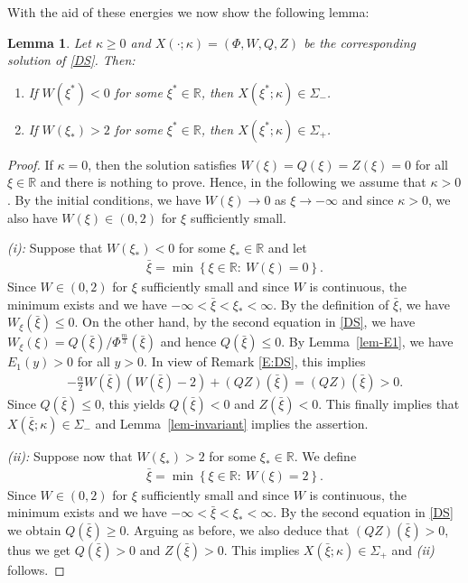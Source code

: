 \documentclass{article}%
\newtheorem{lemma}[theorem]{Lemma}
\newcommand{\alp}{\alpha}
\newcommand{\kap}{\kappa}
\newcommand{\R}{\mathbb{R}}
\begin{document}
With the aid of these energies we now show the following lemma:
\begin{lemma} \label{lem-bounds} %
  Let $\kap \geq 0$ and
  $X(\cdot;\kap)=(\Phi,W,Q,Z)$ be the corresponding solution of \eqref{DS}.
  Then:
  \begin{enumerate}
  \item If $W(\xi^{*}) <0$ for some $\xi^{*} \in \R$, then $X(\xi^{*};\kap)\in\Sigma_{-}$.
  \item If $W(\xi_{\ast})>2$ for some $\xi^{*} \in \R$, then $X(\xi^{*};\kap) \in\Sigma_{+}$.
  \end{enumerate}
\end{lemma}
\begin{proof}
  If $\kap = 0$, then the solution satisfies $W(\xi)=Q(\xi)=Z(\xi)=0$ for all $\xi\in\mathbb{R}$
 and there is nothing to prove. Hence, in the following we assume that $\kappa >0$. 
By the initial conditions, we have $W(\xi) \to 0$ as $\xi \to -\infty$ and since $\kappa > 0$, 
we also have $W(\xi) \in (0,2)$ for $\xi$ sufficiently small.

\medskip

{\it (i):} Suppose that $W(\xi_{\ast }) <0$ for some $\xi_\ast \in \R$ and let
\begin{align}
      \bar{\xi} = \min \left\{ \xi \in\mathbb{R}: \ W(\xi) = 0 \right\}.
\end{align}
Since $W \in (0,2)$ for $\xi$ sufficiently small and since $W$ is continuous, 
the minimum exists and we have $-\infty < \bar{\xi}<\xi_*<\infty$. By the definition of $\bar{\xi}$, 
we have $W_\xi(\bar{\xi}) \leq 0$. On the other hand, by the second equation in \eqref{DS}, 
we have $W_\xi(\xi)=Q(\bar{\xi})/\Phi^{\frac{m}{3}}(\bar{\xi})$ and hence $Q(\bar{\xi})\leq 0$. 
By Lemma~\ref{lem-E1}, we have $E_1(y) > 0$ for all $y > 0$. In view of Remark \ref{E:DS}, this implies
\begin{align}\label{main:ineq2}
 -\frac{\alp}{2} W(\bar \xi)( W(\bar \xi)-2) + (QZ)(\bar \xi)=  (QZ)(\bar \xi)> 0 .
\end{align}
Since $Q(\bar \xi) \leq 0$, this yields $Q(\bar \xi) < 0$ and $Z(\bar{\xi})< 0$. 
This finally implies that $X(\bar{\xi};\kap)\in \Sigma_-$ and Lemma~\ref{lem-invariant} 
implies the assertion.

  \medskip

{\it (ii):} Suppose now that $W(\xi_*) >2$ for some $\xi_* \in \R$. We define
  \begin{align}
    \bar{\xi}=\min \left\{ \xi\in \mathbb{R}: \ W(\xi) = 2 \right\}.
  \end{align}
  Since $W \in (0,2)$ for $\xi$ sufficiently small and since $W$ is continuous, the minimum
 exists and we have $-\infty < \bar{\xi}<\xi_*<\infty$. By the second equation in \eqref{DS} 
we obtain $Q(\bar{\xi})\geq 0$. Arguing as before, we also deduce that $(QZ)(\bar{\xi}) >0$, 
thus we get $Q(\bar{\xi}) >0$ and $Z(\bar{\xi}) >0$. This implies $X(\bar{\xi};\kappa) \in\Sigma_{+}$ 
and {\it (ii)} follows.
\end{proof}
\end{document}
